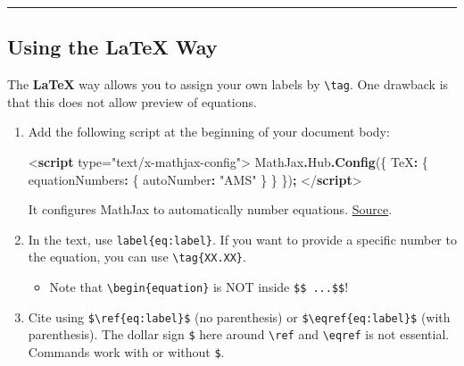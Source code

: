 \documentclass[
  a4paper,
  twoside,
  openright]{book}
\newenvironment{Shaded}{\begin{snugshade}}{\end{snugshade}}
\newcommand{\AttributeTok}[1]{\textcolor[rgb]{0.13,0.29,0.53}{#1}}
\newcommand{\DataTypeTok}[1]{\textcolor[rgb]{0.13,0.29,0.53}{#1}}
\newcommand{\FunctionTok}[1]{\textcolor[rgb]{0.13,0.29,0.53}{\textbf{#1}}}
\newcommand{\KeywordTok}[1]{\textcolor[rgb]{0.13,0.29,0.53}{\textbf{#1}}}
\newcommand{\NormalTok}[1]{#1}
\newcommand{\OperatorTok}[1]{\textcolor[rgb]{0.81,0.36,0.00}{\textbf{#1}}}
\newcommand{\OtherTok}[1]{\textcolor[rgb]{0.56,0.35,0.01}{#1}}
\newcommand{\StringTok}[1]{\textcolor[rgb]{0.31,0.60,0.02}{#1}}
\providecommand{\tightlist}{%
  \setlength{\itemsep}{0pt}\setlength{\parskip}{0pt}}
\theoremstyle{definition}
\theoremstyle{definition}
\theoremstyle{definition}
\theoremstyle{definition}
\theoremstyle{remark}
\begin{document}
\begin{center}\rule{0.5\linewidth}{0.5pt}\end{center}

\subsection{Using the LaTeX Way}\label{using-the-latex-way}

The \textbf{LaTeX} way allows you to assign your own labels by \texttt{\textbackslash{}tag}. One drawback is that this does not allow preview of equations.

\begin{enumerate}
\def\labelenumi{\arabic{enumi}.}
\item
  Add the following script at the beginning of your document body:

\begin{Shaded}
\begin{Highlighting}[]
\DataTypeTok{\textless{}}\KeywordTok{script}\OtherTok{ type=}\StringTok{"text/x{-}mathjax{-}config"}\DataTypeTok{\textgreater{}}
\NormalTok{MathJax}\OperatorTok{.}\AttributeTok{Hub}\OperatorTok{.}\FunctionTok{Config}\NormalTok{(\{}
  \DataTypeTok{TeX}\OperatorTok{:}\NormalTok{ \{ }\DataTypeTok{equationNumbers}\OperatorTok{:}\NormalTok{ \{ }\DataTypeTok{autoNumber}\OperatorTok{:} \StringTok{"AMS"}\NormalTok{ \} \}}
\NormalTok{\})}\OperatorTok{;}
\DataTypeTok{\textless{}/}\KeywordTok{script}\DataTypeTok{\textgreater{}}
\end{Highlighting}
\end{Shaded}

  It configures MathJax to automatically number equations. \href{https://stackoverflow.com/a/55163121/10108921}{Source}.
\item
  In the text, use \texttt{label\{eq:label\}}. If you want to provide a specific number to the equation, you can use \texttt{\textbackslash{}tag\{XX.XX\}}.

  \begin{itemize}
  \tightlist
  \item
    Note that \texttt{\textbackslash{}begin\{equation\}} is {NOT} inside \texttt{\$\$\ ...\$\$}!
  \end{itemize}
\item
  Cite using \texttt{\$\textbackslash{}ref\{eq:label\}\$} (no parenthesis) or \texttt{\$\textbackslash{}eqref\{eq:label\}\$} (with parenthesis). The dollar sign \texttt{\$} here around \texttt{\textbackslash{}ref} and \texttt{\textbackslash{}eqref} is not essential. Commands work with or without \texttt{\$}.


\end{enumerate}
\end{document}
